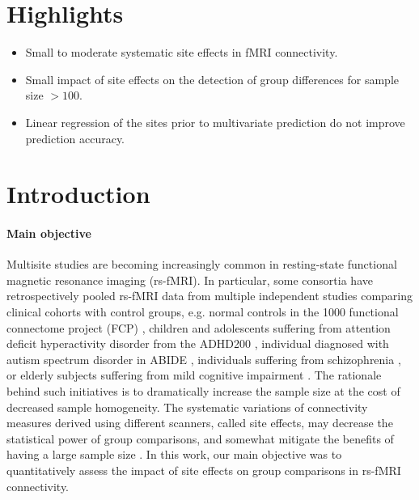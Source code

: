 \documentclass[authoryear]{elsarticle}
\begin{document}
\section*{Highlights}

\begin{itemize}
\item Small to moderate systematic site effects in fMRI connectivity.
\item Small impact of site effects on the detection of group differences for sample size $>100$.
\item Linear regression of the sites prior to multivariate prediction do not improve prediction accuracy.
\end{itemize}

\section{Introduction}

\paragraph{Main objective}
Multisite studies are becoming increasingly common in resting-state functional
magnetic resonance imaging (rs-fMRI). In particular, some consortia have
retrospectively pooled rs-fMRI data from multiple independent studies comparing
clinical cohorts with control groups, e.g. normal controls in the 1000
functional connectome project (FCP) \citep{Biswal2010}, children and adolescents
suffering from attention deficit hyperactivity disorder from the ADHD200
\citep{ADHD200,Fair2012}, individual diagnosed with autism spectrum disorder in
ABIDE \citep{Nielsen2013}, individuals suffering from schizophrenia
\citep{Cheng2015}, or elderly subjects suffering from mild cognitive impairment
\citep{Tam2015}. The rationale behind such initiatives is to dramatically
increase the sample size at the cost of decreased sample homogeneity. The
systematic variations of connectivity measures derived using different scanners,
called site effects, may decrease the statistical power of group comparisons,
and somewhat mitigate the benefits of having a large sample size
\citep{Brown2011,Jovicich2016}. In this work, our main objective was to
quantitatively assess the impact of site effects on group comparisons in rs-fMRI
connectivity.
\end{document}
